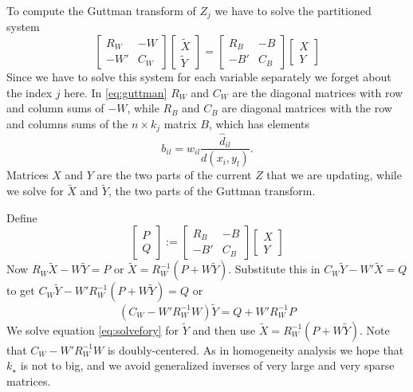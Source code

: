 \documentclass[
  12pt,
]{article}
\begin{document}
To compute the Guttman transform of \(Z_j\) we have to solve
the partitioned system
\begin{equation}
\begin{bmatrix}
R_W&-W\\
-W'&C_W
\end{bmatrix}
\begin{bmatrix}\tilde X\\\tilde Y\end{bmatrix}=
\begin{bmatrix}
R_B&-B\\
-B'&C_B
\end{bmatrix}
\begin{bmatrix}X\\Y\end{bmatrix}
\label{eq:guttman}
\end{equation}
Since we have to solve this system for each variable separately we forget about the index \(j\) here. In
\eqref{eq:guttman} \(R_W\) and \(C_W\) are the diagonal matrices with row and column sums of \(-W\), while \(R_B\) and \(C_B\) are diagonal matrices with the row and columns sums of the \(n\times k_j\) matrix \(B\), which has elements
\begin{equation}
b_{il}=w_{il}\frac{\hat d_{il}}{d(x_i,y_l)}.
\label{eq:bdef}
\end{equation}
Matrices \(X\) and \(Y\) are the two parts of the current \(Z\) that we are updating,
while we solve for \(\tilde X\) and \(\tilde Y\), the two parts of the Guttman
transform.

Define
\begin{equation}
\begin{bmatrix}
P\\Q
\end{bmatrix}:=
\begin{bmatrix}
R_B&-B\\
-B'&C_B
\end{bmatrix}
\begin{bmatrix}X\\Y\end{bmatrix}
\label{eq:gusolve}
\end{equation}
Now
\(R_W\tilde X-W\tilde Y=P\) or \(\tilde X=R_W^{-1}(P+W\tilde Y)\). Substitute this in \(C_W\tilde Y-W'\tilde X=Q\)
to get \(C_W\tilde Y-W'R_W^{-1}(P+W\tilde Y)=Q\) or
\begin{equation}
(C_W-W'R_W^{-1}W)\tilde Y=Q+W'R_W^{-1}P
\label{eq:solvefory}
\end{equation}
We solve equation \eqref{eq:solvefory} for \(\tilde Y\) and then use \(\tilde X=R_W^{-1}(P+W\tilde Y)\).
Note that \(C_W-W'R_W^{-1}W\) is doubly-centered.
As in homogeneity analysis we hope that \(k_\star\)
is not to big, and we avoid generalized inverses of very large and very
sparse matrices.
\end{document}
